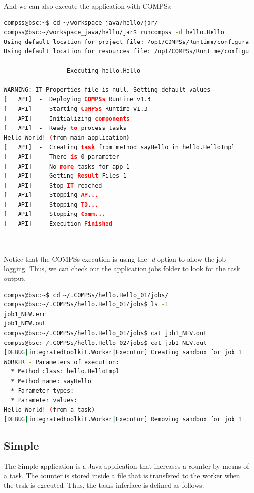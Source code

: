 And we can also execute the application with COMPSs:

\begin{lstlisting}[language=bash]
compss@bsc:~$ cd ~/workspace_java/hello/jar/
compss@bsc:~/workspace_java/hello/jar$ runcompss -d hello.Hello
Using default location for project file: /opt/COMPSs/Runtime/configuration/xml/projects/project.xml
Using default location for resources file: /opt/COMPSs/Runtime/configuration/xml/resources/resources.xml

----------------- Executing hello.Hello --------------------------

WARNING: IT Properties file is null. Setting default values
[   API]  -  Deploying COMPSs Runtime v1.3
[   API]  -  Starting COMPSs Runtime v1.3
[   API]  -  Initializing components
[   API]  -  Ready to process tasks
Hello World! (from main application)
[   API]  -  Creating task from method sayHello in hello.HelloImpl
[   API]  -  There is 0 parameter
[   API]  -  No more tasks for app 1
[   API]  -  Getting Result Files 1
[   API]  -  Stop IT reached
[   API]  -  Stopping AP...
[   API]  -  Stopping TD...
[   API]  -  Stopping Comm...
[   API]  -  Execution Finished

------------------------------------------------------------
\end{lstlisting}

Notice that the COMPSs execution is using the \textit{-d} option to allow the job logging. Thus, we can check out the application jobs folder to look for
the task output.

\begin{lstlisting}[language=bash]
compss@bsc:~$ cd ~/.COMPSs/hello.Hello_01/jobs/
compss@bsc:~/.COMPSs/hello.Hello_01/jobs$ ls -1
job1_NEW.err
job1_NEW.out
compss@bsc:~/.COMPSs/hello.Hello_01/jobs$ cat job1_NEW.out
compss@bsc:~/.COMPSs/hello.Hello_02/jobs$ cat job1_NEW.out 
[DEBUG|integratedtoolkit.Worker|Executor] Creating sandbox for job 1
WORKER - Parameters of execution:
  * Method class: hello.HelloImpl
  * Method name: sayHello
  * Parameter types:
  * Parameter values:
Hello World! (from a task)
[DEBUG|integratedtoolkit.Worker|Executor] Removing sandbox for job 1
\end{lstlisting}

\subsection{Simple}
The Simple application is a Java application that increases a counter by means of a task. The counter is stored inside a file that 
is transfered to the worker when the task is executed. Thus, the tasks inferface is defined as follows:

